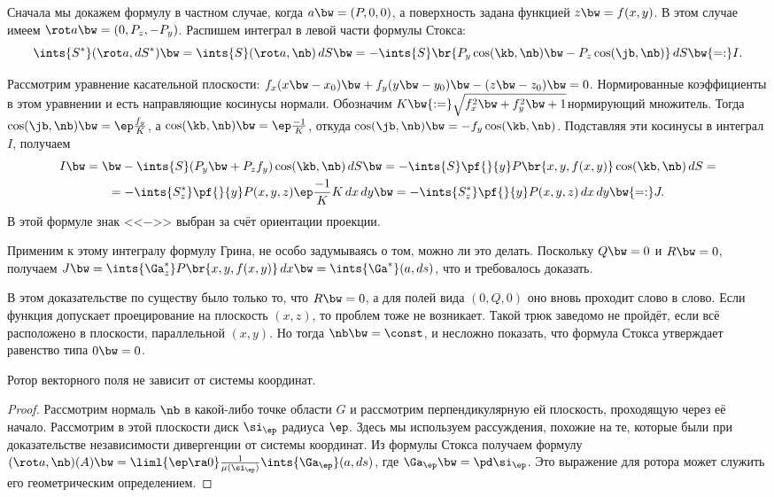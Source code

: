 \documentclass[a4paper]{article}
\begin{document}
Сначала мы докажем формулу в частном случае, когда $a \bw= (P,0,0)$, а поверхность задана
функцией $z \bw= f(x,y)$. В этом случае имеем $\rot a \bw= (0,P_z,-P_y)$. Распишем интеграл
в левой части формулы Стокса:
$$
  \ints{S^*}(\rot a, d S^*) \bw= \ints{S}(\rot a,\nb)\,d S \bw=
  -\ints{S} \br{P_y\cos(\kb, \nb) \bw- P_z\cos(\jb, \nb)}\,d S \bw{=:} I.
$$

Рассмотрим уравнение касательной плоскости: $f_x(x\bw-x_0) \bw+ f_y(y\bw-y_0) \bw- (z\bw-z_0) \bw= 0$.
Нормированные коэффициенты в этом уравнении и есть направляющие косинусы нормали. Обозначим $K \bw{:=}
\sqrt{f_x^2 \bw+ f_y^2 \bw+ 1}$\т нормирующий множитель. Тогда $\cos(\jb, \nb) \bw= \ep\frac{f_y}{K}$, а
$\cos (\kb, \nb) \bw= \ep\frac{-1}{K}$, откуда $\cos(\jb, \nb) \bw= -f_y\cos (\kb, \nb)$. Подставляя эти
косинусы в интеграл $I$, получаем
\begin{multline*}
I \bw= \bw-\ints{S}(P_y \bw+ P_zf_y)\cos (\kb, \nb)\,d S \bw=
-\ints{S}\pf{}{y}P\br{x,y,f(x,y)} \cos(\kb, \nb)\,d S =\\=
-\ints{S_z^*} \pf{}{y} P(x,y,z) \ep\frac{-1}{K} K\,d x \,d y \bw=
-\ints{S_z^*} \pf{}{y} P(x,y,z)\,d x \,d y \bw{=:} J.
\end{multline*}
В этой формуле знак <<$-$>> выбран за счёт ориентации проекции.

Применим к этому интегралу формулу Грина, не особо задумываясь о том, можно ли это делать. Поскольку
$Q \bw= 0$ и $R \bw= 0$, получаем $J \bw= \ints{\Ga_z^*}P\br{x,y,f(x,y)}\,d x \bw= \ints{\Ga^*}(a, d s)$,
что и требовалось доказать.

В этом доказательстве по существу было только то, что $R \bw= 0$, а для полей вида $(0,Q, 0)$ оно вновь
проходит слово в слово. Если функция допускает проецирование на плоскость $(x,z)$, то проблем тоже не
возникает. Такой трюк заведомо не пройдёт, если всё расположено в плоскости, параллельной $(x, y)$. Но тогда
$\nb \bw= \const$, и несложно показать, что формула Стокса утверждает равенство типа $0\bw=0$.

\begin{imp}
Ротор векторного поля не зависит от системы координат.
\end{imp}
\begin{proof}
Рассмотрим нормаль $\nb$ в какой-либо точке области $G$ и рассмотрим перпендикулярную ей плоскость,
проходящую через её начало. Рассмотрим в этой плоскости диск $\si_\ep$ радиуса $\ep$. Здесь мы используем
рассуждения, похожие на те, которые были при доказательстве независимости дивергенции от системы координат.
Из формулы Стокса получаем формулу $(\rot a, \nb)(A) \bw= \liml{\ep \ra 0}
\frac{1}{\mu(\si_\ep)}\ints{\Ga_\ep}(a, d s)$, где $\Ga_\ep \bw= \pd \si_\ep$. Это выражение для ротора
может служить его геометрическим определением.
\end{proof}
\end{document}
